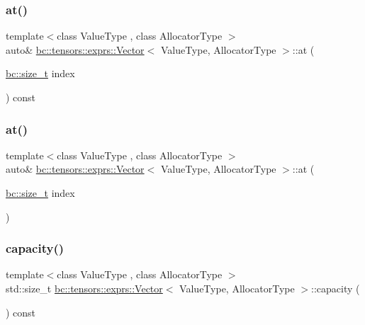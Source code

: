 \subsubsection{\texorpdfstring{at()}{at()}\hspace{0.1cm}{\footnotesize\ttfamily [1/2]}}
{\footnotesize\ttfamily template$<$class Value\+Type , class Allocator\+Type $>$ \\
auto\& \hyperlink{structbc_1_1tensors_1_1exprs_1_1Vector}{bc\+::tensors\+::exprs\+::\+Vector}$<$ Value\+Type, Allocator\+Type $>$\+::at (\begin{DoxyParamCaption}\item[{\hyperlink{namespacebc_aaf8e3fbf99b04b1b57c4f80c6f55d3c5}{bc\+::size\+\_\+t}}]{index }\end{DoxyParamCaption}) const\hspace{0.3cm}{\ttfamily [inline]}}

\mbox{\label{structbc_1_1tensors_1_1exprs_1_1Vector_a6eb567c4b4a0fdfdf5de8a8e6449a60f}} 
\subsubsection{\texorpdfstring{at()}{at()}\hspace{0.1cm}{\footnotesize\ttfamily [2/2]}}
{\footnotesize\ttfamily template$<$class Value\+Type , class Allocator\+Type $>$ \\
auto\& \hyperlink{structbc_1_1tensors_1_1exprs_1_1Vector}{bc\+::tensors\+::exprs\+::\+Vector}$<$ Value\+Type, Allocator\+Type $>$\+::at (\begin{DoxyParamCaption}\item[{\hyperlink{namespacebc_aaf8e3fbf99b04b1b57c4f80c6f55d3c5}{bc\+::size\+\_\+t}}]{index }\end{DoxyParamCaption})\hspace{0.3cm}{\ttfamily [inline]}}

\mbox{\label{structbc_1_1tensors_1_1exprs_1_1Vector_a65f2772bac84cb1e6105c3880135d3fd}} 
\subsubsection{\texorpdfstring{capacity()}{capacity()}}
{\footnotesize\ttfamily template$<$class Value\+Type , class Allocator\+Type $>$ \\
std\+::size\+\_\+t \hyperlink{structbc_1_1tensors_1_1exprs_1_1Vector}{bc\+::tensors\+::exprs\+::\+Vector}$<$ Value\+Type, Allocator\+Type $>$\+::capacity (\begin{DoxyParamCaption}{ }\end{DoxyParamCaption}) const\hspace{0.3cm}{\ttfamily [inline]}}

